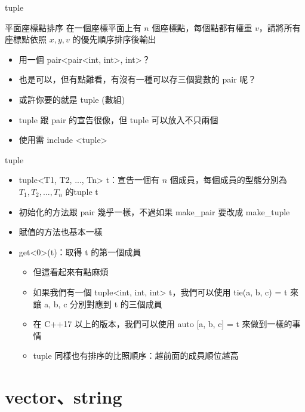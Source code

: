 \documentclass[aspectratio=169]{beamer}
\begin{document}
    \begin{frame}{tuple}
        \begin{block}{平面座標點排序}
            在一個座標平面上有 $n$ 個座標點，每個點都有權重 $v$，請將所有座標點依照 $x, y, v$ 的優先順序排序後輸出
        \end{block}

        \begin{itemize}
            \item<2-> 用一個 pair<pair<int, int>, int>？
            \item<3-> 也是可以，但有點難看，有沒有一種可以存三個變數的 pair 呢？
            \item<4-> 或許你要的就是 tuple (數組)
            \item<5-> tuple 跟 pair 的宣告很像，但 tuple 可以放入不只兩個
            \item<5-> 使用需 include <tuple>
        \end{itemize}
    \end{frame}

    \begin{frame}{tuple}
        \begin{itemize}
            \item<1-> tuple<T1, T2, ..., Tn> t：宣告一個有 $n$ 個成員，每個成員的型態分別為 $T_1, T_2,..., T_n$ 的tuple t
            \item<1-> 初始化的方法跟 pair 幾乎一樣，不過如果 make\_pair 要改成 make\_tuple
            \item<1-> 賦值的方法也基本一樣
            \item<2-> get<0>(t)：取得 t 的第一個成員
                \begin{itemize}
                    \item<3-> 但這看起來有點麻煩
                    \item<4-> 如果我們有一個 tuple<int, int, int> t，我們可以使用 tie(a, b, c) = t 來讓 a, b, c 分別對應到 t 的三個成員
                    \item<4-> 在 C++17 以上的版本，我們可以使用 auto [a, b, c] = t 來做到一樣的事情
                    \item<5-> tuple 同樣也有排序的比照順序：越前面的成員順位越高
                \end{itemize}
        \end{itemize}
    \end{frame}

    \section{vector、string}
\end{document}
